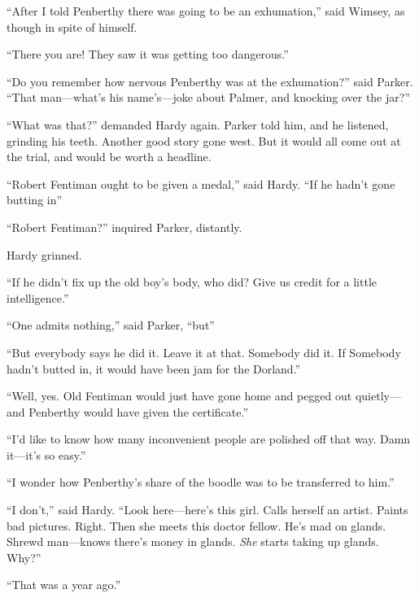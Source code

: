 \enquote{After I told Penberthy there was going to be an exhumation,} said Wimsey, as though in spite of himself.

\enquote{There you are! They saw it was getting too dangerous.}

\enquote{Do you remember how nervous Penberthy was at the exhumation?} said Parker. \enquote{That man\allowbreak---\allowbreak what's his name's\allowbreak---\allowbreak joke about Palmer, and knocking over the jar?}

\enquote{What was that?} demanded Hardy again. Parker told him, and he listened, grinding his teeth. Another good story gone west. But it would all come out at the trial, and would be worth a headline.

\enquote{Robert Fentiman ought to be given a medal,} said Hardy. \enquote{If he hadn't gone butting in\longdash}

\enquote{Robert Fentiman?} inquired Parker, distantly.

Hardy grinned.

\enquote{If he didn't fix up the old boy's body, who did? Give us credit for a little intelligence.}

\enquote{One admits nothing,} said Parker, \enquote{but\longdash}

\enquote{But everybody says he did it. Leave it at that. Somebody did it. If Somebody hadn't butted in, it would have been jam for the Dorland.}

\enquote{Well, yes. Old Fentiman would just have gone home and pegged out quietly\allowbreak---\allowbreak and Penberthy would have given the certificate.}

\enquote{I'd like to know how many inconvenient people are polished off that way. Damn it\allowbreak---\allowbreak it's so easy.}

\enquote{I wonder how Penberthy's share of the boodle was to be transferred to him.}

\enquote{I don't,} said Hardy. \enquote{Look here\allowbreak---\allowbreak here's this girl. Calls herself an artist. Paints bad pictures. Right. Then she meets this doctor fellow. He's mad on glands. Shrewd man\allowbreak---\allowbreak knows there's money in glands. \textit{She} starts taking up glands. Why?}

\enquote{That was a year ago.}

